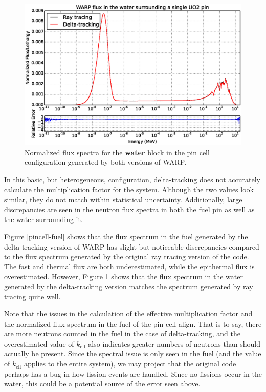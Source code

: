 \begin{figure}[h!]
\includegraphics[width=\textwidth]{img/pincell-water.eps}
\caption{Normalized flux spectra for the \textbf{water} block in the pin cell configuration 
generated by both versions of WARP. \label{pincell-water}}
\end{figure}

In this basic, but heterogeneous, configuration, delta-tracking does not accurately calculate the 
multiplication factor for the system. Although the two values look similar, they do not match within
statistical uncertainty. Additionally, large discrepancies are seen in the neutron flux spectra in both
the fuel pin as well as the water surrounding it.

Figure \ref{pincell-fuel} shows that the flux spectrum in the fuel generated by the delta-tracking version
of WARP has slight but noticeable discrepancies compared to the flux spectrum generated by the original 
ray tracing version of the code. The fast and thermal flux are both underestimated, while the epithermal 
flux is overestimated. However, Figure \ref{pincell-water} shows that the flux spectrum in the water 
generated by the delta-tracking version matches the spectrum generated by ray tracing quite well. 

Note that the issues in the calculation of the effective multiplication factor and the normalized flux
spectrum in the fuel of the pin cell align. That is to say, there are more neutrons counted in the fuel in
the case of delta-tracking, and the overestimated value of $k_{\mathrm{eff}}$ also indicates greater 
numbers of neutrons than should actually be present. Since the spectral issue is only seen in the fuel 
(and the value of $k_{\mathrm{eff}}$ applies to the entire system), we may project that the original code 
perhaps has a bug in how fission events are handled. Since no fissions occur in the water, this could be a
potential source of the error seen above.

